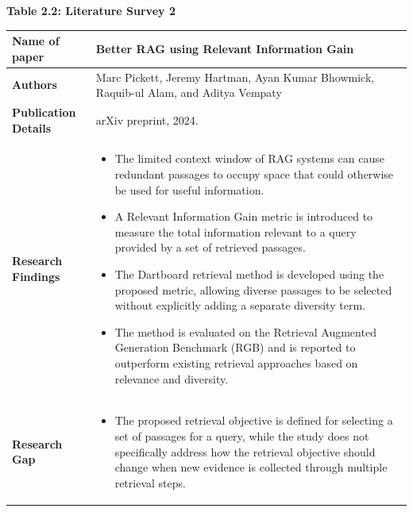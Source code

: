 \documentclass[12pt,a4paper]{report}
\begin{document}
\clearpage



\begin{center}
\textbf{Table 2.2: Literature Survey 2}
\end{center}

\begin{longtable}{|p{1.25in}|p{5.15in}|}

\hline

\textbf{Name of paper} &
\textbf{Better RAG using Relevant Information Gain}
\\ \hline

\textbf{Authors} &
Marc Pickett, Jeremy Hartman, Ayan Kumar Bhowmick, Raquib-ul Alam, and Aditya Vempaty
\\ \hline

\textbf{Publication Details} &
arXiv preprint, 2024.
\\ \hline

\textbf{Research Findings} &
\begin{itemize}[
    leftmargin=0.18in,
    itemsep=0.05in,
    topsep=0pt,
    parsep=0pt
]
    \item The limited context window of RAG systems can cause redundant passages to occupy space that could otherwise be used for useful information.

    \item A Relevant Information Gain metric is introduced to measure the total information relevant to a query provided by a set of retrieved passages.

    \item The Dartboard retrieval method is developed using the proposed metric, allowing diverse passages to be selected without explicitly adding a separate diversity term.

    \item The method is evaluated on the Retrieval Augmented Generation Benchmark (RGB) and is reported to outperform existing retrieval approaches based on relevance and diversity.
\end{itemize}
\\ \hline

\textbf{Research Gap} &
\begin{itemize}[
    leftmargin=0.18in,
    itemsep=0.05in,
    topsep=0pt,
    parsep=0pt
]
    \item The proposed retrieval objective is defined for selecting a set of passages for a query, while the study does not specifically address how the retrieval objective should change when new evidence is collected through multiple retrieval steps.


\end{itemize}
\end{longtable}
\end{document}
